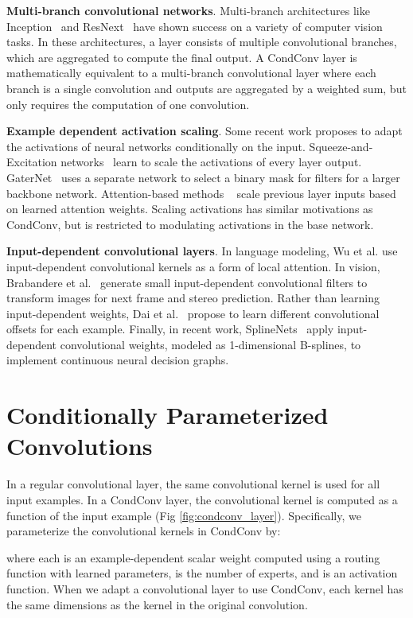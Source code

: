 \documentclass{article}
\def\codename{CondConv}
\begin{document}
\textbf{Multi-branch convolutional networks}. Multi-branch architectures like Inception~\cite{szegedy2015going} and ResNext~\cite{xie2017aggregated} have shown success on a variety of computer vision tasks. In these architectures, a layer consists of multiple convolutional branches, which are aggregated to compute the final output. A \codename{} layer is mathematically equivalent to a multi-branch convolutional layer where each branch is a single convolution and outputs are aggregated by a weighted sum, but only requires the computation of one convolution.

\textbf{Example dependent activation scaling}. Some recent work proposes to adapt the activations of neural networks conditionally on the input. Squeeze-and-Excitation networks~\cite{hu2018squeeze} learn to scale the activations of every layer output. GaterNet~\cite{chen18} uses a separate network to select a binary mask for filters for a larger backbone network. Attention-based methods ~\cite{luong2015effective, bahdanau2014neural, vaswani2017attention} scale previous layer inputs based on learned attention weights. Scaling activations has similar motivations as \codename{}, but is restricted to modulating activations in the base network.

\textbf{Input-dependent convolutional layers}. In language modeling, Wu et al. \cite{wu2019pay} use input-dependent convolutional kernels as a form of local attention. In vision, Brabandere et al.~\cite{jia2016dynamic} generate small input-dependent convolutional filters to transform images for next frame and stereo prediction. Rather than learning input-dependent weights, Dai et al.~\cite{dai2017deformable} propose to learn different convolutional offsets for each example. Finally, in recent work,  SplineNets~\cite{keskin18} apply input-dependent convolutional weights, modeled as 1-dimensional B-splines, to implement continuous neural decision graphs.

\section{Conditionally Parameterized Convolutions}
In a regular convolutional layer, the same convolutional kernel is used for all input examples. In a \codename{} layer, the convolutional kernel is computed as a function of the input example (Fig \ref{fig:condconv_layer}). Specifically, we parameterize the convolutional kernels in \codename{} by:

where each  is an example-dependent scalar weight computed using a routing function with learned parameters,  is the number of experts, and  is an activation function. When we adapt a convolutional layer to use \codename{}, each kernel  has the same dimensions as the kernel in the original convolution.
\end{document}

